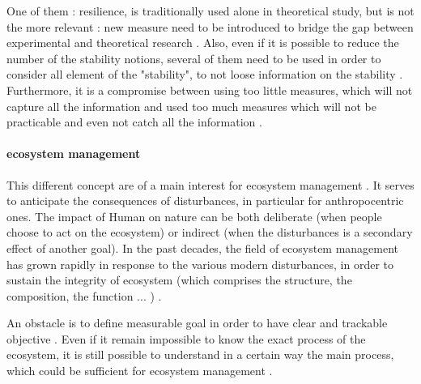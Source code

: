 \documentclass{article}
\begin{document}
One of them : resilience, is traditionally used alone in theoretical study, but is not the more relevant : new measure need to be introduced to bridge the gap between experimental and theoretical research \cite{arnoldi2016resilience} \cite{gunderson2000ecological} \cite{neubert_alternatives_1997} . Also, even if it is possible to reduce the number of the stability notions, several of them need to be used in order to consider all element of the "stability", to not loose information on the stability \cite{derissen_relationship_2011}. Furthermore, it is a compromise between using too little measures, which will not capture all the information and used too much measures which will not be practicable and even not catch all the information \cite{hillebrand2018decomposing}.









\newpage

\paragraph{ecosystem management \\}

This different concept are of a main interest for ecosystem management \cite{mumby2014ecological}. It serves to anticipate the consequences of disturbances, in particular for anthropocentric ones. The impact of Human on nature can be both deliberate (when people choose to act on the ecosystem) or indirect (when the disturbances is a secondary effect of another goal). In the past decades, the field of ecosystem management has grown rapidly \cite{grumbine1997reflections} in response to the various modern disturbances, in order to sustain the integrity of ecosystem (which comprises the structure, the composition, the function ... ) \cite{jensen1994overview}. 

An obstacle is to define measurable goal in order to have clear and trackable objective \cite{slocombe1998defining}. Even if it remain impossible to know the exact process of the ecosystem, it is still possible to understand in a certain way the main process, which could be sufficient for ecosystem management \cite{mori2011ecosystem}\cite{slocombe1998defining}\cite{stanley1995ecosystem}. 
\end{document}
